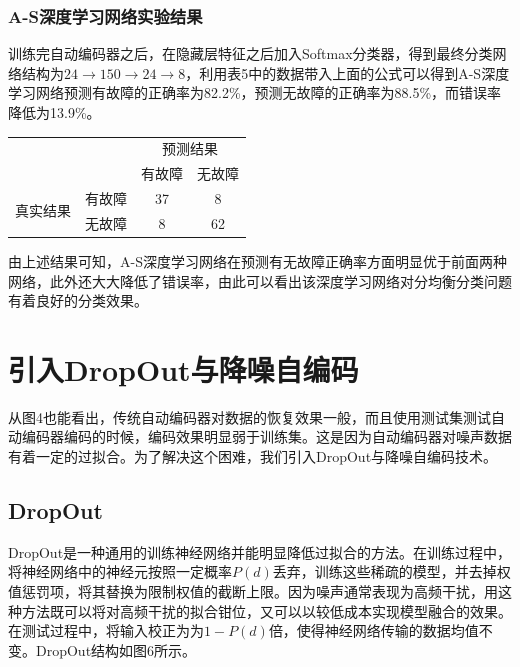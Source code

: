 \documentclass{ctacn}%
\begin{document}
\begin{multicols}{2}
\subsubsection{A-S深度学习网络实验结果}

训练完自动编码器之后，在隐藏层特征之后加入Softmax分类器，得到最终分类网络结构为$24\rightarrow150\rightarrow24\rightarrow8$，利用表5中的数据带入上面的公式可以得到A-S深度学习网络预测有故障的正确率为82.2\%，预测无故障的正确率为88.5\%，而错误率降低为13.9\%。

\begin{center}
	\label{tab:5}
	\begin{tabular} {cccc}\toprule
		\multirow{2}{*}[-2pt]{}&\multirow{2}{*}[-2pt]{}&\multicolumn{2}{c}{预测结果}\\
		\cmidrule(lr){3-4}
		&&有故障&无故障\\\hline
		\multirow{2}{*}[-2pt]{真实结果}&有故障&37&8\\
		&无故障&8&62\\
		\bottomrule
\end{tabular}\end{center}

由上述结果可知，A-S深度学习网络在预测有无故障正确率方面明显优于前面两种网络，此外还大大降低了错误率，由此可以看出该深度学习网络对分均衡分类问题有着良好的分类效果。

\section{引入DropOut与降噪自编码}
从图4也能看出，传统自动编码器对数据的恢复效果一般，而且使用测试集测试自动编码器编码的时候，编码效果明显弱于训练集。这是因为自动编码器对噪声数据有着一定的过拟合。为了解决这个困难，我们引入DropOut与降噪自编码技术。

\subsection{DropOut}

DropOut是一种通用的训练神经网络并能明显降低过拟合的方法。在训练过程中，将神经网络中的神经元按照一定概率$P(d)$丢弃，训练这些稀疏的模型，并去掉权值惩罚项，将其替换为限制权值的截断上限。因为噪声通常表现为高频干扰，用这种方法既可以将对高频干扰的拟合钳位，又可以以较低成本实现模型融合的效果。在测试过程中，将输入校正为为$1-P(d)$倍，使得神经网络传输的数据均值不变。DropOut结构如图6所示。


\end{multicols}
\end{document}
